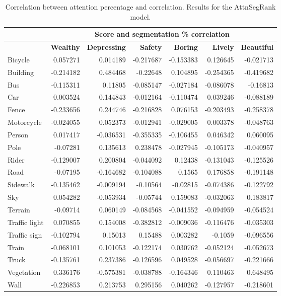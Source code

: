 \begin{table}[H]
    \begin{tabular}{|l|rrrrrr|}
    \hline
    & \multicolumn{6}{c|}{\textbf{Score and segmentation \% correlation}}              \\ \hline
    & \textbf{Wealthy}   & \textbf{Depressing} & \textbf{Safety}    & \textbf{Boring}    & \textbf{Lively}    & \textbf{Beautiful} \\ \hline
    Bicycle       & 0.057271  & 0.014189   & -0.217687 & -0.153383 & 0.126645  & -0.021713 \\
    Building      & -0.214182 & 0.484468   & -0.22648  & 0.104895  & -0.254365 & -0.419682 \\
    Bus           & -0.115311 & 0.11805    & -0.085147 & -0.027184 & -0.086078 & -0.16813  \\
    Car           & 0.003524  & 0.144843   & -0.012164 & -0.110474 & 0.039246  & -0.088189 \\
    Fence         & -0.233656 & 0.244746   & -0.216828 & 0.076153  & -0.203493 & -0.258378 \\
    Motorcycle    & -0.024055 & 0.052373   & -0.012941 & -0.029005 & 0.003378  & -0.048763 \\
    Person        & 0.017417  & -0.036531  & -0.355335 & -0.106455 & 0.046342  & 0.060095  \\
    Pole          & -0.07281  & 0.135613   & 0.238478  & -0.027945 & -0.105173 & -0.040957 \\
    Rider         & -0.129007 & 0.200804   & -0.044092 & 0.12438   & -0.131043 & -0.125526 \\
    Road          & -0.07195  & -0.164682  & -0.104088 & 0.1565    & 0.176858  & -0.191148 \\
    Sidewalk      & -0.135462 & -0.009194  & -0.10564  & -0.02815  & -0.074386 & -0.122792 \\
    Sky           & 0.054282  & -0.053934  & -0.05744  & 0.159083  & -0.032063 & 0.183817  \\
    Terrain       & -0.09714  & 0.060149   & -0.084568 & -0.041552 & -0.094959 & -0.054524 \\
    Traffic light & 0.070855  & 0.154008   & -0.382812 & -0.009036 & -0.116476 & -0.035303 \\
    Traffic sign  & -0.102794 & 0.15013    & 0.15488   & 0.003282  & -0.1059   & -0.096556 \\
    Train         & -0.068101 & 0.101053   & -0.122174 & 0.030762  & -0.052124 & -0.052673 \\
    Truck         & -0.135761 & 0.237386   & -0.126596 & 0.049528  & -0.056697 & -0.221666 \\
    Vegetation    & 0.336176  & -0.575381  & -0.038788 & -0.164346 & 0.110463  & 0.648495  \\
    Wall          & -0.226853 & 0.213753   & 0.295156  & 0.040262  & -0.127957 & -0.218601 \\
    \hline
    \end{tabular}
    \caption[Score and attention correlation.]{
        Correlation between attention percentage and correlation. Results for the
        AttnSegRank model.
	}
	\label{tab:seg_correlation}
\end{table}
